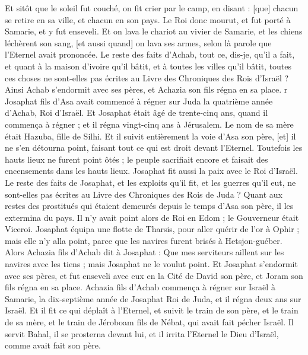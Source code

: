 \begin{multicols}{2}
Et sitôt que le soleil fut couché, on fit crier par le camp, en disant : [que] chacun se retire en sa ville, et chacun en son pays.
Le Roi donc mourut, et fut porté à Samarie, et y fut enseveli.
Et on lava le chariot au vivier de Samarie, et les chiens léchèrent son sang, [et aussi quand] on lava ses armes, selon là parole que l'Eternel avait prononcée.
Le reste des faits d'Achab, tout ce, dis-je, qu'il a fait, et quant à la maison d'ivoire qu'il bâtit, et à toutes les villes qu'il bâtit, toutes ces choses ne sont-elles pas écrites au Livre des Chroniques des Rois d'Israël ?
Ainsi Achab s'endormit avec ses pères, et Achazia son fils régna en sa place.
r Josaphat fils d'Asa avait commencé à régner sur Juda la quatrième année d'Achab, Roi d'Israël.
Et Josaphat était âgé de trente-cinq ans, quand il commença à régner ; et il régna vingt-cinq ans à Jérusalem. Le nom de sa mère était Hazuba, fille de Silhi.
Et il suivit entièrement la voie d'Asa son père, [et] il ne s'en détourna point, faisant tout ce qui est droit devant l'Eternel.
Toutefois les hauts lieux ne furent point ôtés ; le peuple sacrifiait encore et faisait des encensements dans les hauts lieux.
Josaphat fit aussi la paix avec le Roi d'Israël.
Le reste des faits de Josaphat, et les exploits qu'il fit, et les guerres qu'il eut, ne sont-elles pas écrites au Livre des Chroniques des Rois de Juda ?
Quant aux restes des prostitués qui étaient demeurés depuis le temps d'Asa son père, il les extermina du pays.
Il n'y avait point alors de Roi en Edom ; le Gouverneur était Viceroi.
Josaphat équipa une flotte de Tharsis, pour aller quérir de l'or à Ophir ; mais elle n'y alla point, parce que les navires furent brisés à Hetsjon-guéber.
Alors Achazia fils d'Achab dit à Josaphat : Que mes serviteurs aillent sur les navires avec les tiens ; mais Josaphat ne le voulut point.
Et Josaphat s'endormit avec ses pères, et fut enseveli avec eux en la Cité de David son père, et Joram son fils régna en sa place.
Achazia fils d'Achab commença à régner sur Israël à Samarie, la dix-septième année de Josaphat Roi de Juda, et il régna deux ans sur Israël.
Et il fit ce qui déplaît à l'Eternel, et suivit le train de son père, et le train de sa mère, et le train de Jéroboam fils de Nébat, qui avait fait pécher Israël.
Il servit Bahal, il se prosterna devant lui, et il irrita l'Eternel le Dieu d'Israël, comme avait fait son père.
\PPE{}
\end{multicols}
